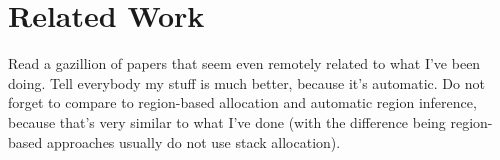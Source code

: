 
\chapter{Related Work}
	\label{chapter:rel}
	Read a gazillion of papers that seem even remotely related to what I've been doing. Tell everybody my stuff is much
	better, because it's automatic. Do not forget to compare to region-based allocation and automatic region inference,
	because that's very similar to what I've done (with the difference being region-based approaches usually do not use
	stack allocation).
